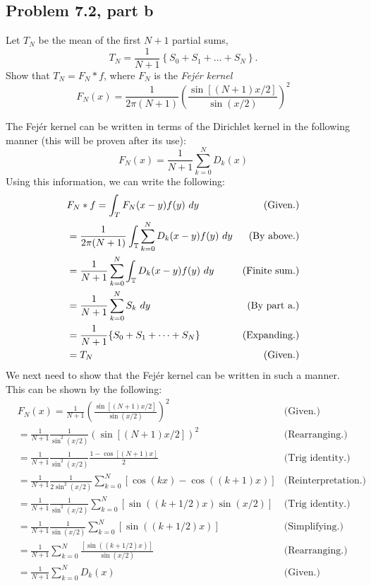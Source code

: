 \newpage
\subsection{Problem 7.2, part b}
Let $T_N$ be the mean of the first $N+1$ partial sums,
\[T_N = \frac{1}{N+1} \left \{ S_0 + S_1 + \dots + S_N\right \}.\]
Show that $T_N = F_N \ast f$, where $F_N$ is the \textit{Fej\'er kernel}
\[F_N(x) = \frac{1}{2\pi (N+1)}\left( \frac{\sin [(N + 1)x/2]}{\sin(x/2)}\right)^2 \]
\partbreak
\begin{solution}
    
    The Fej\'er kernel can be written in terms of the Dirichlet kernel in the following manner (this will be proven after its use):
    \[F_N(x) = \frac{1}{N+1}\sum_{k = 0}^N D_k(x)\]
    Using this information, we can write the following:
    \tightalignbreak
    \begin{align*}
        &F_N \ast f = \int_T F_N(x - y)f(y) \ dy &\text{(Given.)}\\
        &= \frac{1}{2\pi (N+1)}\int_\scT \sum_{k = 0}^N D_k(x - y) f(y) \ dy &\text{(By above.)}\\
        &= \frac{1}{N+1}\sum_{k = 0}^N\int_{\scT}D_k(x - y) f(y) \ dy &\text{(Finite sum.)}\\
        &= \frac{1}{N+1}\sum_{k = 0}^NS_k \ dy &\text{(By part a.)}\\
        &= \frac{1}{N+1}\{ S_0 + S_1 + \cdots + S_N\} &\text{(Expanding.)}\\
        &= T_N &\text{(Given.)}
    \end{align*}
    \vspace{-12mm}\alignbreak
    \newpage
    We next need to show that the Fej\'er kernel can be written in such a manner. This can be shown by the following:
    \tightalignbreak
    \begin{align*}
        &F_N(x) = \frac{1}{N+1}\left(\frac{\sin\left[ (N+1)x/2\right]}{\sin(x/2)}\right)^2 &\text{(Given.)}\\
        &= \frac{1}{N+1}\frac{1}{\sin^2(x/2)}\left(\sin\left[ (N+1)x/2\right]\right)^2 &\text{(Rearranging.)}\\
        &= \frac{1}{N+1}\frac{1}{\sin^2(x/2)}\frac{1 - \cos \left[ (N+1)x\right]}{2} &\text{(Trig identity.)}\\
        &= \frac{1}{N+1}\frac{1}{2\sin^2(x/2)}\sum_{k = 0}^N \left[ \cos(kx) - \cos((k+1)x)\right] &\text{(Reinterpretation.)}\\
        &= \frac{1}{N+1}\frac{1}{\sin^2(x/2)}\sum_{k = 0}^N \left[ \sin((k+1/2)x) \sin(x/2)\right] &\text{(Trig identity.)}\\
        &= \frac{1}{N+1}\frac{1}{\sin(x/2)}\sum_{k = 0}^N \left[ \sin((k+1/2)x) \right] &\text{(Simplifying.)}\\
        &= \frac{1}{N+1}\sum_{k = 0}^N \frac{\left[ \sin((k+1/2)x) \right]}{\sin(x/2)} &\text{(Rearranging.)}\\
        &= \frac{1}{N+1}\sum_{k = 0}^N D_k(x) &\text{(Given.)} 
    \end{align*}
    \vspace{-12mm}\alignbreak
\end{solution}

